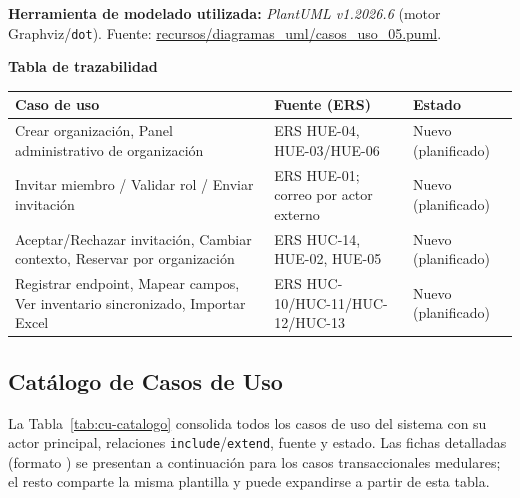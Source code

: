 \bigskip
{\sloppy\noindent\textbf{Herramienta de modelado utilizada:} \textit{PlantUML v1.2026.6} (motor Graphviz/\texttt{dot}). Fuente: \url{recursos/diagramas_uml/casos_uso_05.puml}.\par}

\bigskip
\noindent\textbf{Tabla de trazabilidad}
\begin{longtable}{|L{5cm}|L{7.5cm}|M{2cm}|}
\hline
{} \textbf{Caso de uso} & \textbf{Fuente (ERS)} & \textbf{Estado} \\ \hline
\endhead
Crear organización, Panel administrativo de organización & ERS HUE-04, HUE-03/HUE-06 & Nuevo (planificado) \\ \hline
Invitar miembro / Validar rol / Enviar invitación & ERS HUE-01; correo por actor externo & Nuevo (planificado) \\ \hline
Aceptar/Rechazar invitación, Cambiar contexto, Reservar por organización & ERS HUC-14, HUE-02, HUE-05 & Nuevo (planificado) \\ \hline
Registrar endpoint, Mapear campos, Ver inventario sincronizado, Importar Excel & ERS HUC-10/HUC-11/HUC-12/HUC-13 & Nuevo (planificado) \\ \hline
\end{longtable}
\clearpage

\subsection{Catálogo de Casos de Uso}
\noindent La Tabla~\ref{tab:cu-catalogo} consolida todos los casos de uso del sistema con su actor principal, relaciones \texttt{\guillemotleft include\guillemotright}/\texttt{\guillemotleft extend\guillemotright}, fuente y estado. Las fichas detalladas (formato \cite{ref21}) se presentan a continuación para los casos transaccionales medulares; el resto comparte la misma plantilla y puede expandirse a partir de esta tabla.

